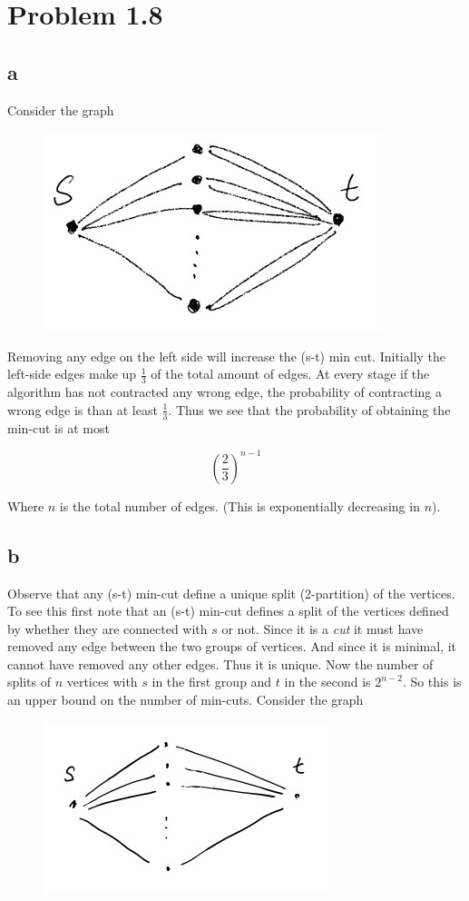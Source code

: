 


\section*{Problem 1.8}

\subsection*{a}

Consider the graph

\begin{figure}[H]
	\centering
	\includegraphics[width=0.4\linewidth]{figures/graph1.jpg}
\end{figure}

Removing any edge on the left side will increase the (s-t) min cut. 
Initially the left-side edges make up $\frac{1}{3}$ of the total amount of edges.
At every stage if the algorithm has not contracted any wrong edge, the probability of contracting a wrong edge is than at least $\frac{1}{3}$. Thus we see that the probability of obtaining the min-cut is at most

$$ \left(\frac{2}{3}\right)^{n-1} $$

Where $n$ is the total number of edges. (This is exponentially decreasing in $n$).

\subsection*{b}

Observe that any (s-t) min-cut define a unique split (2-partition) of the vertices.
To see this first note that an (s-t) min-cut defines a split of the vertices defined by whether they are connected with $s$ or not. 
Since it is a \emph{cut} it must have removed any edge between the two groups of vertices.
And since it is minimal, it cannot have removed any other edges. 
Thus it is unique.
Now the number of splits of $n$ vertices with $s$ in the first group and $t$ in the second is $2^{n-2}$.
So this is an upper bound on the number of min-cuts.
Consider the graph

\begin{figure}[H]
	\centering
	\includegraphics[width=0.4\linewidth]{figures/graph2.jpg}
\end{figure}

